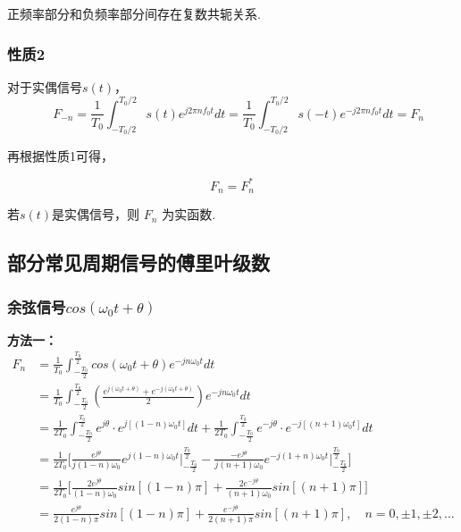 \documentclass[UTF8]{article}
\theoremstyle{definition}
\begin{document}
正频率部分和负频率部分间存在复数共轭关系.


\subsubsection{性质2}
对于实偶信号$s(t)$，
\begin{equation*}
 \quad F_{-n}=\frac{1}{T_0} \int_{-T_0 / 2}^{T_0 / 2} s(t) e^{j 2 \pi n f_0 t} d t=\frac{1}{T_0} \int_{-T_0 / 2}^{T_0 / 2} s(-t) e^{-j 2 \pi n f_0 t} d t=F_n
\end{equation*}

再根据性质1可得，

\begin{equation*}
F_n = F_n^*
\end{equation*}

若$s(t)$是实偶信号，则 $F_n$ 为实函数.

\subsection{部分常见周期信号的傅里叶级数}
\subsubsection{余弦信号$cos(\omega_0t+\theta)$}
\noindent\textbf{方法一：}
\begin{equation*}
\begin{aligned}
F_n &= \frac{1}{T_0}\int_{-\frac{T_0}{2}}^{\frac{T_0}{2}}cos(\omega_0t+\theta)e^{-jn\omega_0t}dt \\
& =  \frac{1}{T_0}\int_{-\frac{T_0}{2}}^{\frac{T_0}{2}}(  \frac{e^{j(\omega_0t+\theta)}+e^{-j(\omega_0t+\theta)}}{2}  )e^{-jn\omega_0t}dt\\
& = \frac{1}{2T_0}\int_{-\frac{T_0}{2}}^{\frac{T_0}{2}}e^{j\theta}\cdot e^{j[(1-n)\omega_0t]}dt + \frac{1}{2T_0}\int_{-\frac{T_0}{2}}^{\frac{T_0}{2}}e^{-j\theta}\cdot e^{-j[(n+1)\omega_0t]}dt\\
&= \frac{1}{2T_0}\bigg[  \frac{e^{j\theta}}{j(1-n)\omega_0} e^{j(1-n)\omega_0t}\bigg|_{-\frac{T_0}{2}}^{\frac{T_0}{2}} - \frac{-e^{j\theta}}{j(n+1)\omega_0} e^{-j(1+n)\omega_0t}\bigg|_{-\frac{T_0}{2}}^{\frac{T_0}{2}} \bigg]\\
& = \frac{1}{2T_0}\bigg[  \frac{2e^{j\theta}}{(1-n)\omega_0}sin[(1-n)\pi]+  \frac{2e^{-j\theta}}{(n+1)\omega_0} sin[(n+1)\pi]\bigg]\\
& =  \frac{e^{j\theta}}{2(1-n)\pi}sin[(1-n)\pi]+  \frac{e^{-j\theta}}{2(n+1)\pi} sin[(n+1)\pi],\quad n = 0,\pm1,\pm 2,\ldots
\end{aligned}
\end{equation*}
\end{document}
